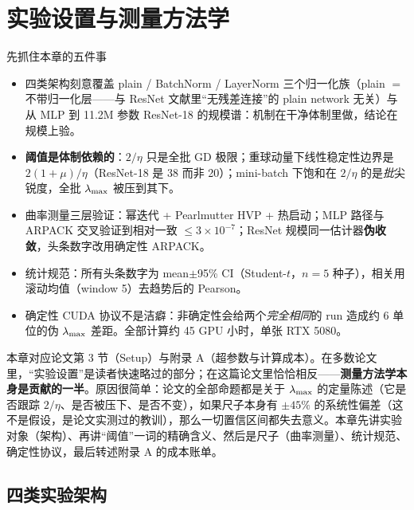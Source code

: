 \section{实验设置与测量方法学}
\label{sec:ch03}

\begin{keybox}{先抓住本章的五件事}
\begin{itemize}
  \item 四类架构刻意覆盖 plain / BatchNorm / LayerNorm 三个归一化族（plain $=$ 不带归一化层——与 ResNet 文献里``无残差连接''的 plain network 无关）与从 MLP 到 11.2M 参数 ResNet-18 的规模谱：机制在干净体制里做，结论在规模上验。
  \item \textbf{阈值是体制依赖的}：$2/\eta$ 只是全批 GD 极限；重球动量下线性稳定性边界是 $2(1{+}\mu)/\eta$（ResNet-18 是 38 而非 20）；mini-batch 下饱和在 $2/\eta$ 的是\emph{批}尖锐度，全批 $\lambda_{\max}$ 被压到其下。
  \item 曲率测量三层验证：幂迭代 + Pearlmutter HVP + 热启动；MLP 路径与 ARPACK 交叉验证到相对一致 $\le3\times10^{-7}$；ResNet 规模同一估计器\textbf{伪收敛}，头条数字改用确定性 ARPACK。
  \item 统计规范：所有头条数字为 mean$\pm$95\% CI（Student-$t$，$n=5$ 种子），相关用滚动均值（window 5）去趋势后的 Pearson。
  \item 确定性 CUDA 协议不是洁癖：非确定性会给两个\emph{完全相同}的 run 造成约 6 单位的伪 $\lambda_{\max}$ 差距。全部计算约 45 GPU 小时，单张 RTX 5080。
\end{itemize}
\end{keybox}

\noindent 本章对应论文第 3 节（Setup）与附录
A（超参数与计算成本）。在多数论文里，“实验设置”是读者快速略过的部分；在这篇论文里恰恰相反——\textbf{测量方法学本身是贡献的一半}。原因很简单：论文的全部命题都是关于
$\lambda_{\max}$ 的定量陈述（它是否跟踪 $2/\eta$、是否被压下、是否不变），如果尺子本身有 $\pm
45\%$
的系统性偏差（这不是假设，是论文实测过的教训），那么一切置信区间都失去意义。本章先讲实验对象（架构）、再讲“阈值”一词的精确含义、然后是尺子（曲率测量）、统计规范、确定性协议，最后转述附录
A 的成本账单。

\subsection{四类实验架构}
\label{sec:ch03-arch}

